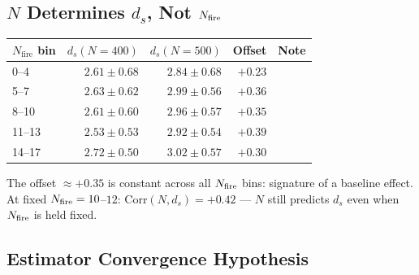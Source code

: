 \documentclass[12pt, a4paper]{article}
\begin{document}
\subsection{$N$ Determines $d_s$, Not $N_{\rm fire}$}

\begin{derivedbox}[title={$N$ Determines $d_s$ Offset (Confirmed Across All $N_{\rm fire}$ Bins)}]
\begin{center}
\renewcommand{\arraystretch}{1.5}
\begin{tabular}{lrrrl}
\toprule
$N_{\mathrm{fire}}$ bin & $d_s(N=400)$ & $d_s(N=500)$ & Offset & Note\\
\midrule
0--4   & $2.61\pm 0.68$ & $2.84\pm 0.68$ & $+0.23$ & \\
5--7   & $2.63\pm 0.62$ & $2.99\pm 0.56$ & $+0.36$ & \\
8--10  & $2.61\pm 0.60$ & $2.96\pm 0.57$ & $+0.35$ & \\
11--13 & $2.53\pm 0.53$ & $2.92\pm 0.54$ & $+0.39$ & \\
14--17 & $2.72\pm 0.50$ & $3.02\pm 0.57$ & $+0.30$ & \\
\bottomrule
\end{tabular}
\end{center}
The offset $\approx +0.35$ is constant across all $N_{\rm fire}$ bins: signature of a baseline effect.
At fixed $N_{\rm fire}=10$--$12$: $\mathrm{Corr}(N, d_s)=+0.42$ --- $N$ still predicts $d_s$ even when $N_{\rm fire}$ is held fixed.
\end{derivedbox}

\subsection{Estimator Convergence Hypothesis}
\end{document}
